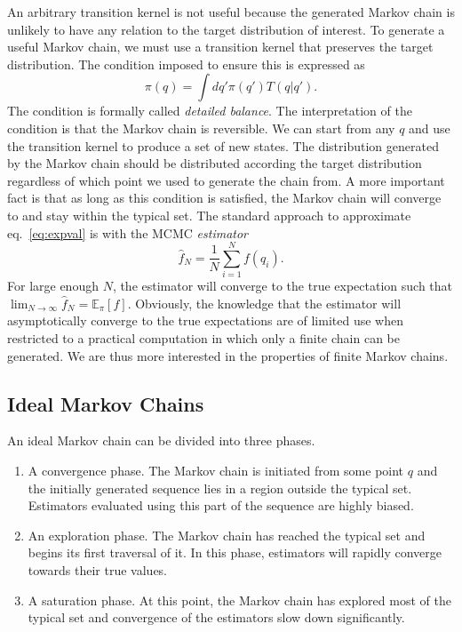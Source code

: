 An arbitrary transition kernel is not useful because the generated Markov chain is unlikely to have any relation to the target distribution
of interest. To generate a useful Markov chain, we must use a transition kernel that preserves the target distribution. 
The condition imposed to ensure this is expressed as
\begin{equation}\label{eq:detailed_balance}
    \pi(q) = \int dq' \pi(q')T(q|q').
\end{equation}
The condition is formally called \textit{detailed balance}. The interpretation of the condition is that the Markov chain is reversible.
We can start from any $q$ and use the transition kernel to produce a set of new states. The distribution generated by the Markov chain
should be distributed according the target distribution regardless of which point we used to generate the chain from. A more important
fact is that as long as this condition is satisfied, the Markov chain will converge to and stay within the typical set.
The standard approach to approximate eq.~\eqref{eq:expval} is with the MCMC \textit{estimator}
\begin{equation}
    \hat{f}_N = \frac{1}{N}\sum_{i=1}^N f(q_i).
\end{equation}
For large enough $N$, the estimator will converge to the true expectation such that $\lim_{N\to\infty} \hat{f}_N = \mathbb{E}_\pi[f]$.
Obviously, the knowledge that the estimator will asymptotically converge to the true expectations are of limited use
when restricted to a practical computation in which only a finite chain can be generated. 
We are thus more interested in the properties of finite Markov chains.

\subsection{Ideal Markov Chains}
An ideal Markov chain can be divided into three phases.
\begin{enumerate}
    \item A convergence phase. The Markov chain is initiated from some point $q$ and the initially generated sequence
    lies in a region outside the typical set. Estimators evaluated using this part of the sequence are highly biased.
    \item An exploration phase. The Markov chain has reached the typical set and begins its first traversal of it.
    In this phase, estimators will rapidly converge towards their true values.
    \item A saturation phase. At this point, the Markov chain has explored most of the typical set and convergence
    of the estimators slow down significantly.
\end{enumerate}
The ideal evaluation of estimators thus only use the parts of Markov chain generated in the second and third phase, discarding the
the chain generated in the first phase. The notion of discarding the points from the first phase is called \textit{burn-in}.

